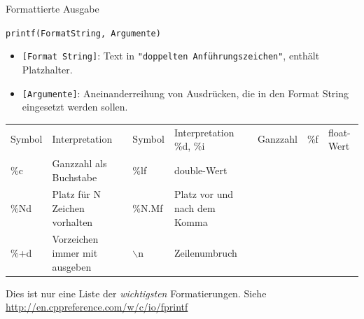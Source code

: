 
\begin{frame}[fragile]{Formattierte Ausgabe}
%
\footnotesize
\begin{codebox}[Syntax]
	\texttt{printf(FormatString, Argumente)}
\end{codebox}
\begin{itemize}
\item \texttt{[Format String]}: Text in \texttt{"doppelten Anführungszeichen"}, enthält
	Platzhalter.
\item \texttt{[Argumente]}: Aneinanderreihung von Ausdrücken, die in den Format String eingesetzt
	werden sollen.
\end{itemize}
%
\begin{table}
	\footnotesize
	\begin{tabularx}
		{\linewidth}
		{LP|LP}
		\toprule[1pt]
		
		\normalfont Symbol & Interpretation                & \normalfont Symbol & Interpretation \tabcrlf
		\%d, \%i           & Ganzzahl                      & \%f    & float-Wert \\
		\%c                & Ganzzahl als Buchstabe        & \%lf   & double-Wert \\
		\%Nd               & Platz für N Zeichen vorhalten & \%N.Mf & Platz vor und nach dem Komma \\
		\%+d               & Vorzeichen immer mit ausgeben & $\backslash$n & Zeilenumbruch\\
	\end{tabularx}
\end{table}
\tiny Dies ist nur eine Liste der \emph{wichtigsten} Formatierungen. 
Siehe \url{http://en.cppreference.com/w/c/io/fprintf}
%
\end{frame}


